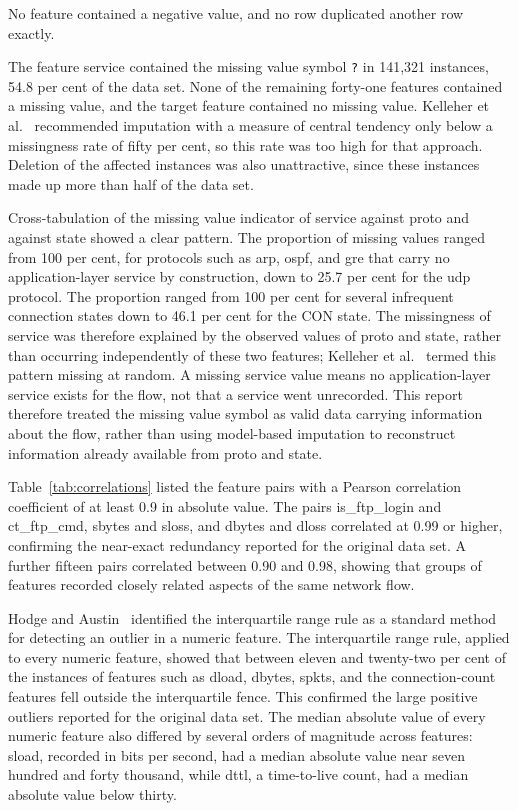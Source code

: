 \documentclass[10pt,conference]{IEEEtran}
\begin{document}
No feature contained a negative value, and no row duplicated another row exactly.

The feature service contained the missing value symbol \texttt{?} in 141,321 instances, 54.8 per cent of the data set. None of the remaining forty-one features contained a missing value, and the target feature contained no missing value. Kelleher et al.~\cite{kelleher2020} recommended imputation with a measure of central tendency only below a missingness rate of fifty per cent, so this rate was too high for that approach. Deletion of the affected instances was also unattractive, since these instances made up more than half of the data set.

Cross-tabulation of the missing value indicator of service against proto and against state showed a clear pattern. The proportion of missing values ranged from 100 per cent, for protocols such as arp, ospf, and gre that carry no application-layer service by construction, down to 25.7 per cent for the udp protocol. The proportion ranged from 100 per cent for several infrequent connection states down to 46.1 per cent for the CON state. The missingness of service was therefore explained by the observed values of proto and state, rather than occurring independently of these two features; Kelleher et al.~\cite{kelleher2020} termed this pattern missing at random. A missing service value means no application-layer service exists for the flow, not that a service went unrecorded. This report therefore treated the missing value symbol as valid data carrying information about the flow, rather than using model-based imputation to reconstruct information already available from proto and state.

Table~\ref{tab:correlations} listed the feature pairs with a Pearson correlation coefficient of at least 0.9 in absolute value. The pairs is\_ftp\_login and ct\_ftp\_cmd, sbytes and sloss, and dbytes and dloss correlated at 0.99 or higher, confirming the near-exact redundancy reported for the original data set. A further fifteen pairs correlated between 0.90 and 0.98, showing that groups of features recorded closely related aspects of the same network flow.

Hodge and Austin~\cite{hodge2004} identified the interquartile range rule as a standard method for detecting an outlier in a numeric feature. The interquartile range rule, applied to every numeric feature, showed that between eleven and twenty-two per cent of the instances of features such as dload, dbytes, spkts, and the connection-count features fell outside the interquartile fence. This confirmed the large positive outliers reported for the original data set. The median absolute value of every numeric feature also differed by several orders of magnitude across features: sload, recorded in bits per second, had a median absolute value near seven hundred and forty thousand, while dttl, a time-to-live count, had a median absolute value below thirty.
\end{document}
